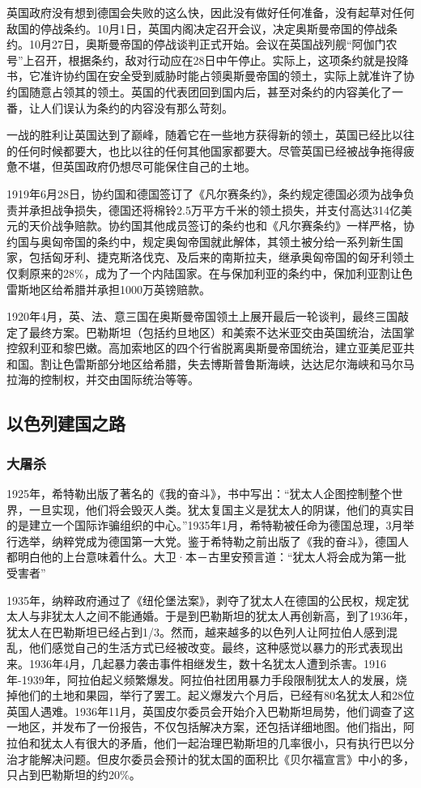 \documentclass{article}
\begin{document}
英国政府没有想到德国会失败的这么快，因此没有做好任何准备，没有起草对任何敌国的停战条约。10月1日，英国内阁决定召开会议，决定奥斯曼帝国的停战条约。10月27日，奥斯曼帝国的停战谈判正式开始。会议在英国战列舰“阿伽门农号”上召开，根据条约，敌对行动应在28日中午停止。实际上，这项条约就是投降书，它准许协约国在安全受到威胁时能占领奥斯曼帝国的领土，实际上就准许了协约国随意占领其的领土。英国的代表团回到国内后，甚至对条约的内容美化了一番，让人们误认为条约的内容没有那么苛刻。

一战的胜利让英国达到了巅峰，随着它在一些地方获得新的领土，英国已经比以往的任何时候都要大，也比以往的任何其他国家都要大。尽管英国已经被战争拖得疲惫不堪，但英国政府仍想尽可能保住自己的土地。

1919年6月28日，协约国和德国签订了《凡尔赛条约》，条约规定德国必须为战争负责并承担战争损失，德国还将棉铃2.5万平方千米的领土损失，并支付高达314亿美元的天价战争赔款。协约国其他成员签订的条约也和《凡尔赛条约》一样严格，协约国与奥匈帝国的条约中，规定奥匈帝国就此解体，其领土被分给一系列新生国家，包括匈牙利、捷克斯洛伐克、及后来的南斯拉夫，继承奥匈帝国的匈牙利领土仅剩原来的28\%，成为了一个内陆国家。在与保加利亚的条约中，保加利亚割让色雷斯地区给希腊并承担1000万英镑赔款。

1920年4月，英、法、意三国在奥斯曼帝国领土上展开最后一轮谈判，最终三国敲定了最终方案。巴勒斯坦（包括约旦地区）和美索不达米亚交由英国统治，法国掌控叙利亚和黎巴嫩。高加索地区的四个行省脱离奥斯曼帝国统治，建立亚美尼亚共和国。割让色雷斯部分地区给希腊，失去博斯普鲁斯海峡，达达尼尔海峡和马尔马拉海的控制权，并交由国际统治等等。\clearpage
\subsection{以色列建国之路}
\subsubsection{大屠杀}
1925年，希特勒出版了著名的《我的奋斗》，书中写出：“犹太人企图控制整个世界，一旦实现，他们将会毁灭人类。犹太复国主义是犹太人的阴谋，他们的真实目的是建立一个国际诈骗组织的中心。”1935年1月，希特勒被任命为德国总理，3月举行选举，纳粹党成为德国第一大党。鉴于希特勒之前出版了《我的奋斗》，德国人都明白他的上台意味着什么。大卫·本－古里安预言道：“犹太人将会成为第一批受害者”

1935年，纳粹政府通过了《纽伦堡法案》，剥夺了犹太人在德国的公民权，规定犹太人与非犹太人之间不能通婚。于是到巴勒斯坦的犹太人再创新高，到了1936年，犹太人在巴勒斯坦已经占到1/3。然而，越来越多的以色列人让阿拉伯人感到混乱，他们感觉自己的生活方式已经被改变。最终，这种感觉以暴力的形式表现出来。1936年4月，几起暴力袭击事件相继发生，数十名犹太人遭到杀害。1916年-1939年，阿拉伯起义频繁爆发。阿拉伯社团用暴力手段限制犹太人的发展，烧掉他们的土地和果园，举行了罢工。起义爆发六个月后，已经有80名犹太人和28位英国人遇难。1936年11月，英国皮尔委员会开始介入巴勒斯坦局势，他们调查了这一地区，并发布了一份报告，不仅包括解决方案，还包括详细地图。他们指出，阿拉伯和犹太人有很大的矛盾，他们一起治理巴勒斯坦的几率很小，只有执行巴以分治才能解决问题。但皮尔委员会预计的犹太国的面积比《贝尔福宣言》中小的多，只占到巴勒斯坦的约20\%。
\end{document}
